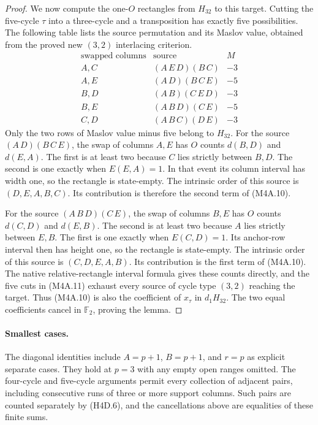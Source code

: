 \documentclass[11pt,oneside]{report}
\theoremstyle{definition}
\numberwithin{equation}{section}
\begin{document}
\begin{proof}
We now compute the one-$O$ rectangles from $H_{32}$ to this target.
Cutting the five-cycle $\tau$ into a three-cycle and a transposition
has exactly five possibilities.
The following table lists the source permutation and its Maslov
value, obtained from the proved new $(3,2)$ interlacing criterion.
\[
\begin{array}{c|c|c}
 \text{swapped columns}&\text{source}&M\\ \hline
 A,C&(A\,E\,D)(B\,C)&-3\\
 A,E&(A\,D)(B\,C\,E)&-5\\
 B,D&(A\,B)(C\,E\,D)&-3\\
 B,E&(A\,B\,D)(C\,E)&-5\\
 C,D&(A\,B\,C)(D\,E)&-3
\end{array}
 \tag{M4A.11}
\]
Only the two rows of Maslov value minus five belong to $H_{32}$.
For the source $(A\,D)(B\,C\,E)$, the swap of columns $A,E$
has $O$ counts $d(B,D)$ and $d(E,A)$.
The first is at least two because $C$ lies strictly between $B,D$.
The second is one exactly when $E(E,A)=1$.
In that event its column interval has width one, so the rectangle
is state-empty.
The intrinsic order of this source is $(D,E,A,B,C)$.
Its contribution is therefore the second term of (M4A.10).

For the source $(A\,B\,D)(C\,E)$, the swap of columns $B,E$
has $O$ counts $d(C,D)$ and $d(E,B)$.
The second is at least two because $A$ lies strictly between $E,B$.
The first is one exactly when $E(C,D)=1$.
Its anchor-row interval then has height one, so the rectangle is
state-empty.
The intrinsic order of this source is $(C,D,E,A,B)$.
Its contribution is the first term of (M4A.10).
The native relative-rectangle interval formula gives these counts
directly, and the five cuts in (M4A.11) exhaust every source of
cycle type $(3,2)$ reaching the target.
Thus (M4A.10) is also the coefficient of $x_\tau$ in $d_1H_{32}$.
The two equal coefficients cancel in $\mathbb F _2$, proving the
lemma.
\end{proof}

\paragraph{Smallest cases.}
The diagonal identities include $A=p+1$, $B=p+1$, and $r=p$
as explicit separate cases.
They hold at $p=3$ with any empty open ranges omitted.
The four-cycle and five-cycle arguments permit every collection of
adjacent pairs, including consecutive runs of three or more support
columns. Such pairs are counted separately by (H4D.6), and the
cancellations above are equalities of these finite sums.
\end{document}
